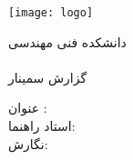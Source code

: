 \thispagestyle{empty}
\noindent
\begin{center}
\texttt{[image: logo]} \\
\begin{Large}
دانشکده فنی مهندسی\\
\fadepart \\ [1cm]
گزارش سمینار \falevel \\
\famajor
\end{Large}
\vskip 1.5cm
{\Large{عنوان :}}  \vspace{0.3cm}\\ \textbf{\huge{\fatitle}}
\vskip 1.5cm
\Large{استاد راهنما:} \\ {\LARGE{\fasupervisor}}
\vskip 1.5cm
\vskip 1.5cm
\Large{نگارش:} \\ {\LARGE{\faAuthor}}
\vskip 1.5cm
{\large{\fadate}}
\end{center}

